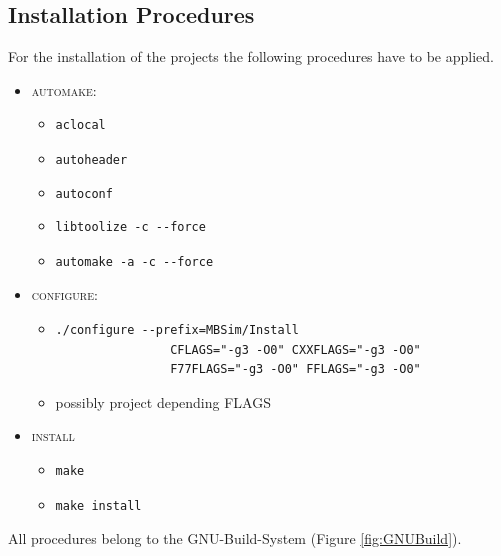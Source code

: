 \subsection{Installation Procedures}
For the installation of the projects the following procedures have to be applied.
\begin{itemize}
	\item \textsc{automake}:
	\begin{itemize}
		\item[] \begin{verbatim}aclocal\end{verbatim}
		\item[] \texttt{autoheader}
		\item[] \texttt{autoconf}
		\item[] \begin{verbatim}libtoolize -c --force\end{verbatim}
		\item[] \begin{verbatim}automake -a -c --force\end{verbatim}
	\end{itemize}
	\item \textsc{configure}: 
	\begin{itemize}
		\item[] \begin{verbatim}./configure --prefix=MBSim/Install
				CFLAGS="-g3 -O0" CXXFLAGS="-g3 -O0"
				F77FLAGS="-g3 -O0" FFLAGS="-g3 -O0"
				\end{verbatim}
		\item[] possibly project depending FLAGS
	\end{itemize}
	\item \textsc{install}
	\begin{itemize}	
		\item \begin{verbatim}make\end{verbatim}
		\item \begin{verbatim}make install\end{verbatim}
	\end{itemize}
\end{itemize}
All procedures belong to the GNU-Build-System (Figure \ref{fig:GNUBuild}).\par
